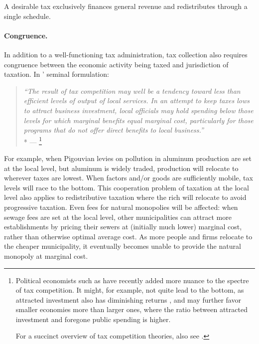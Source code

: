 \begin{desideratum}
	A desirable tax exclusively finances general revenue and redistributes through a single schedule.
	\label{des:redistribution-and-revenue-are-one}
\end{desideratum}

\paragraph[Congruence]{Congruence.}
In addition to a well-functioning tax administration, tax collection also requires congruence between the economic activity being taxed and jurisdiction of taxation.
In \citeauthor{Oates1972}' seminal formulation:

\begin{quote}
	\emph{``The result of tax competition may well be a tendency toward less than efficient levels of output of local services.
	In an attempt to keep taxes lows to attract business investment, local officials may hold spending below those levels for which marginal benefits equal marginal cost, particularly for those programs that do not offer direct benefits to local business.''}
	\\*
	--- \citet[143]{Oates1972}
	\footnote{
		Political economists such as \cite{Dehejia1999} have recently added more nuance to the spectre of tax competition.
		It might, for example, not quite lead to the bottom, as attracted investment also has diminishing returns \citeyearpar[416]{Dehejia1999}, and may further favor smaller economies more than larger ones, where the ratio between attracted investment and foregone public spending is higher.

		For a succinct overview of tax competition theories, also see \cite{Wilson1999}.
	}
\end{quote}

For example, when Pigouvian levies on pollution in aluminum production are set at the local level, but aluminum is widely traded, production will relocate to wherever taxes are lowest.
When factors and/or goods are sufficiently mobile, tax levels will race to the bottom.
This cooperation problem of taxation at the local level also applies to redistributive taxation where the rich will relocate to avoid progressive taxation.
Even fees for natural monopolies will be affected:
when sewage fees are set at the local level, other municipalities can attract more establishments by pricing their sewers at (initially much lower) marginal cost, rather than otherwise optimal average cost.
As more people and firms relocate to the cheaper municipality, it eventually becomes unable to provide the natural monopoly at marginal cost.

